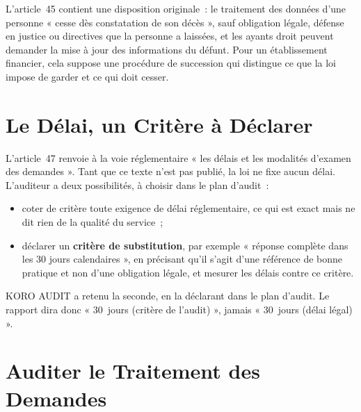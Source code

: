 L'article~45 contient une disposition originale~: le traitement des données
d'une personne « cesse dès constatation de son décès », sauf obligation
légale, défense en justice ou directives que la personne a laissées, et les
ayants droit peuvent demander la mise à jour des informations du défunt.
Pour un établissement financier, cela suppose une procédure de succession
qui distingue ce que la loi impose de garder et ce qui doit cesser.

\section{Le Délai, un Critère à Déclarer}
\label{sec:c06-delai}

L'article~47 renvoie à la voie réglementaire « les délais et les modalités
d'examen des demandes ». Tant que ce texte n'est pas publié, la loi ne fixe
aucun délai. L'auditeur a deux possibilités, à choisir dans le plan
d'audit~:

\begin{itemize}
    \item coter \NEK{} de critère toute exigence de délai réglementaire, ce
          qui est exact mais ne dit rien de la qualité du service~;
    \item déclarer un \textbf{critère de substitution}, par exemple
          « réponse complète dans les 30 jours calendaires », en précisant
          qu'il s'agit d'une référence de bonne pratique et non d'une
          obligation légale, et mesurer les délais contre ce critère.
\end{itemize}

KORO AUDIT a retenu la seconde, en la déclarant dans le plan d'audit. Le
rapport dira donc « 30~jours (critère de l'audit) », jamais « 30~jours
(délai légal) ».

\section{Auditer le Traitement des Demandes}
\label{sec:c06-auditer}

